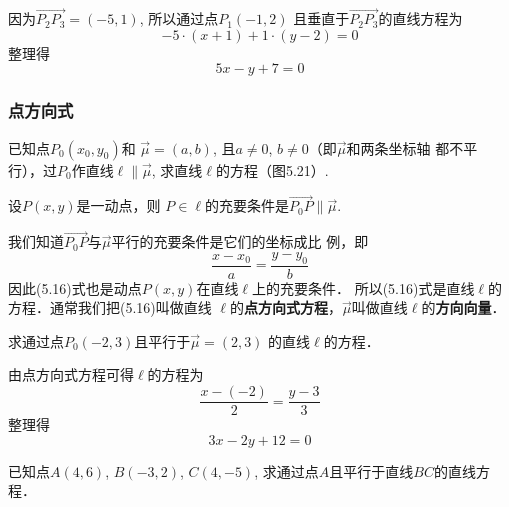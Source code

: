 \begin{solution}
因为$\Vec{P_2P_3}=(-5,1)$, 所以通过点$P_1(-1,2)$
且垂直于$\Vec{P_2P_3}$的直线方程为
\[-5\cdot (x+1)+1\cdot (y-2)=0\]
整理得
\[5x-y+7=0\]
\end{solution}

\subsubsection{点方向式}
已知点$P_0(x_0,y_0)$和
$\vec{\mu}=(a,b)$, 且$a\ne 0$, 
$b\ne 0$（即$\vec{\mu}$和两条坐标轴
都不平行），过$P_0$作直线$\ell\parallel \vec{\mu}$, 
求直线$\ell$的方程（图5.21）.

\begin{figure}[htp]
    \centering
{}
    \caption{}
\end{figure}


设$P(x,y)$是一动点，则
$P\in\ell$的充要条件是$\Vec{P_0P}\parallel \vec{\mu}$.

我们知道$\Vec{P_0P}$与$\vec{\mu}$平行的充要条件是它们的坐标成比
例，即
\begin{equation}
    \frac{x-x_0}{a}=\frac{y-y_0}{b}
\end{equation}
因此(5.16)式也是动点$P(x,y)$在直线$\ell$上的充要条件．
所以(5.16)式是直线$\ell$的方程．通常我们把(5.16)叫做直线
$\ell$的\textbf{点方向式方程}，$\vec{\mu}$叫做直线$\ell$的\textbf{方向向量}．

\begin{example}
    求通过点$P_0(-2,3)$且平行于$\vec{\mu}=(2,3)$
的直线$\ell$的方程．
\end{example}

\begin{solution}
    由点方向式方程可得$\ell$的方程为
\[\frac{x -(-2)}{2} =\frac{y-3}{3}\]
整理得
\[3x-2y+12=0\]
\end{solution}

\begin{example}
    已知点$A(4,6)$, $B(-3,2)$, $C(4,-5)$, 
求通过点$A$且平行于直线$BC$的直线方程．
\end{example}


